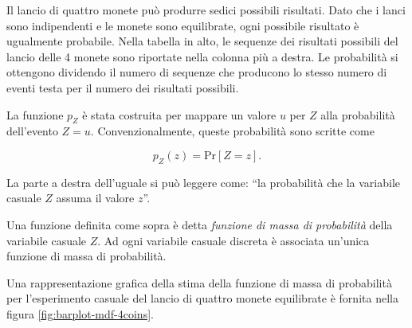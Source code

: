 \documentclass[
  11pt,
]{krantz}
\theoremstyle{definition}
\theoremstyle{definition}
\theoremstyle{definition}
\theoremstyle{definition}
\theoremstyle{remark}
\begin{document}
Il lancio di quattro monete può produrre sedici possibili risultati. Dato che i lanci sono indipendenti e le monete sono equilibrate, ogni possibile risultato è ugualmente probabile. Nella tabella in alto, le sequenze dei risultati possibili del lancio delle 4 monete sono riportate nella colonna più a destra. Le probabilità si ottengono dividendo il numero di sequenze che producono lo stesso numero di eventi testa per il numero dei risultati possibili.

La funzione \(p_Z\) è stata costruita per mappare un valore \(u\) per \(Z\) alla probabilità dell'evento \(Z = u\). Convenzionalmente, queste probabilità sono scritte come

\[
p_Z(z) = \mbox{Pr}[Z = z].
\]

La parte a destra dell'uguale si può leggere come: ``la probabilità che la variabile casuale \(Z\) assuma il valore \(z\)''.

Una funzione definita come sopra è detta \emph{funzione di massa di probabilità} della variabile casuale \(Z\). Ad ogni variabile casuale discreta è associata un'unica funzione di massa di probabilità.

Una rappresentazione grafica della stima della funzione di massa di probabilità per l'esperimento casuale del lancio di quattro monete equilibrate è fornita nella figura \ref{fig:barplot-mdf-4coins}.
\end{document}
